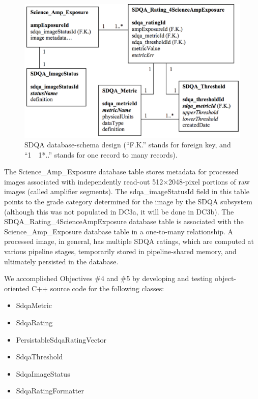 \begin{figure}
\includegraphics[scale=0.5,bb=0 0 925 573]{images/O7A2_1}
\caption{SDQA database-schema design (``F.K.'' stands for foreign key, and ``1~{\jot 24pt}~1*..'' stands for one record to many records).} 
 \label{DB}
\end{figure}

The Science\_Amp\_Exposure database table stores metadata for
processed images associated with independently read-out 
512$\times$2048-pixel portions of 
raw images (called amplifier 
segments).  The sdqa\_imageStatusId field in this table points to the grade
category determined for the image by the SDQA subsystem (although this was not populated
in DC3a, it will be done in DC3b).  
The SDQA\_Rating\_4ScienceAmpExposure database table is associated with 
the Science\_Amp\_Exposure database table in a one-to-many
relationship.  A processed image, in general, has multiple SDQA ratings, which
are computed at various pipeline stages, temporarily stored in pipeline-shared memory, and 
ultimately persisted in the database.


We accomplished Objectives \#4 and \#5 by developing and testing object-oriented C++
source code for the following classes:

\begin{itemize}
\item{SdqaMetric}
\item{SdqaRating}
\item{PersistableSdqaRatingVector}
\item{SdqaThreshold}
\item{SdqaImageStatus}
\item{SdqaRatingFormatter}
\end{itemize}

